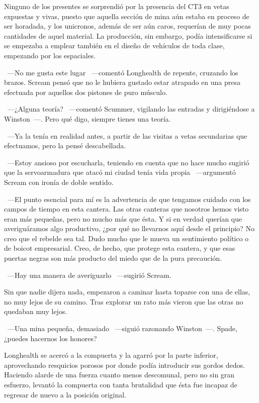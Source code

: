 Ninguno de los presentes se sorprendió por la presencia del CT3 en vetas expuestas y vivas, puesto que aquella sección de mina aún estaba en proceso de ser horadada, y los unicronos, además de ser aún caros, requerían de muy pocas cantidades de aquel material. La producción, sin embargo, podía intensificarse si se empezaba a emplear también en el diseño de vehículos de toda clase, empezando por los espaciales.

~---No me gusta este lugar ~---comentó Longhealth de repente, cruzando los brazos. Scream pensó que no le hubiera gustado estar atrapado en una presa efectuada por aquellos dos pistones de puro músculo.

~---¿Alguna teoría? ~---comentó Scummer, vigilando las entradas y dirigiéndose a Winston~---. Pero qué digo, siempre tienes una teoría.

~---Ya la tenía en realidad antes, a partir de las visitas a vetas secundarias que efectuamos, pero la pensé descabellada.

~---Estoy ansioso por escucharla, teniendo en cuenta que no hace mucho sugirió que la servoarmadura que atacó mi ciudad tenía vida propia ~---argumentó Scream con ironía de doble sentido.

~---El punto esencial para mí es la advertencia de que tengamos cuidado con los campos de tiempo en esta cantera. Las otras canteras que nosotros hemos visto eran más pequeñas, pero no mucho más que ésta. Y si en verdad querían que averiguáramos algo productivo, ¿por qué no llevarnos aquí desde el principio? No creo que el rebelde sea tal. Dudo mucho que le mueva un sentimiento político o de boicot empresarial. Creo, de hecho, que protege esta cantera, y que esas puertas negras son más producto del miedo que de la pura precaución.

~---Hay una manera de averiguarlo ~---sugirió Scream.

Sin que nadie dijera nada, empezaron a caminar hasta toparse con una de ellas, no muy lejos de su camino. Tras explorar un rato más vieron que las otras no quedaban muy lejos.

~---Una mina pequeña, demasiado ~---siguió razonando Winston~---. Spade, ¿puedes hacernos los honores?

Longhealth se acercó a la compuerta y la agarró por la parte inferior, aprovechando resquicios porosos por donde podía introducir sus gordos dedos. Haciendo alarde de una fuerza cuanto menos descomunal, pero no sin gran esfuerzo, levantó la compuerta con tanta brutalidad que ésta fue incapaz de regresar de nuevo a la posición original.

